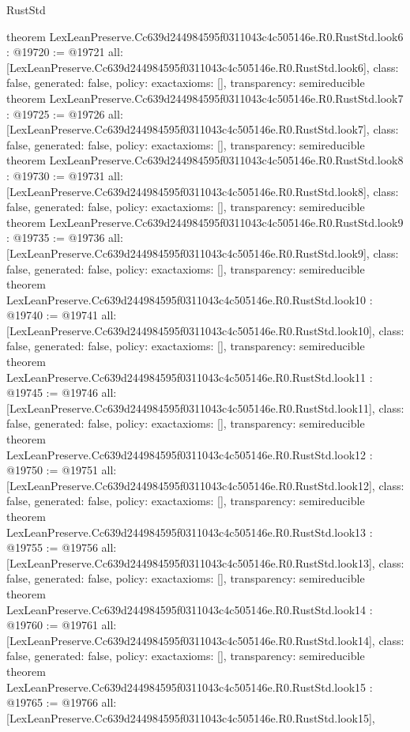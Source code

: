 \begin{lexlean}{RustStd}
\begin{coremodule}
{}
theorem LexLeanPreserve.Cc639d244984595f0311043c4c505146e.R0.RustStd.look6 : @19720 := @19721 {
  all: [LexLeanPreserve.Cc639d244984595f0311043c4c505146e.R0.RustStd.look6],
  class: false,
  generated: false,
  policy: exact{axioms: []},
  transparency: semireducible
}
theorem LexLeanPreserve.Cc639d244984595f0311043c4c505146e.R0.RustStd.look7 : @19725 := @19726 {
  all: [LexLeanPreserve.Cc639d244984595f0311043c4c505146e.R0.RustStd.look7],
  class: false,
  generated: false,
  policy: exact{axioms: []},
  transparency: semireducible
}
theorem LexLeanPreserve.Cc639d244984595f0311043c4c505146e.R0.RustStd.look8 : @19730 := @19731 {
  all: [LexLeanPreserve.Cc639d244984595f0311043c4c505146e.R0.RustStd.look8],
  class: false,
  generated: false,
  policy: exact{axioms: []},
  transparency: semireducible
}
theorem LexLeanPreserve.Cc639d244984595f0311043c4c505146e.R0.RustStd.look9 : @19735 := @19736 {
  all: [LexLeanPreserve.Cc639d244984595f0311043c4c505146e.R0.RustStd.look9],
  class: false,
  generated: false,
  policy: exact{axioms: []},
  transparency: semireducible
}
theorem LexLeanPreserve.Cc639d244984595f0311043c4c505146e.R0.RustStd.look10 : @19740 := @19741 {
  all: [LexLeanPreserve.Cc639d244984595f0311043c4c505146e.R0.RustStd.look10],
  class: false,
  generated: false,
  policy: exact{axioms: []},
  transparency: semireducible
}
theorem LexLeanPreserve.Cc639d244984595f0311043c4c505146e.R0.RustStd.look11 : @19745 := @19746 {
  all: [LexLeanPreserve.Cc639d244984595f0311043c4c505146e.R0.RustStd.look11],
  class: false,
  generated: false,
  policy: exact{axioms: []},
  transparency: semireducible
}
theorem LexLeanPreserve.Cc639d244984595f0311043c4c505146e.R0.RustStd.look12 : @19750 := @19751 {
  all: [LexLeanPreserve.Cc639d244984595f0311043c4c505146e.R0.RustStd.look12],
  class: false,
  generated: false,
  policy: exact{axioms: []},
  transparency: semireducible
}
theorem LexLeanPreserve.Cc639d244984595f0311043c4c505146e.R0.RustStd.look13 : @19755 := @19756 {
  all: [LexLeanPreserve.Cc639d244984595f0311043c4c505146e.R0.RustStd.look13],
  class: false,
  generated: false,
  policy: exact{axioms: []},
  transparency: semireducible
}
theorem LexLeanPreserve.Cc639d244984595f0311043c4c505146e.R0.RustStd.look14 : @19760 := @19761 {
  all: [LexLeanPreserve.Cc639d244984595f0311043c4c505146e.R0.RustStd.look14],
  class: false,
  generated: false,
  policy: exact{axioms: []},
  transparency: semireducible
}
theorem LexLeanPreserve.Cc639d244984595f0311043c4c505146e.R0.RustStd.look15 : @19765 := @19766 {
  all: [LexLeanPreserve.Cc639d244984595f0311043c4c505146e.R0.RustStd.look15],
}
\end{coremodule}
\end{lexlean}
